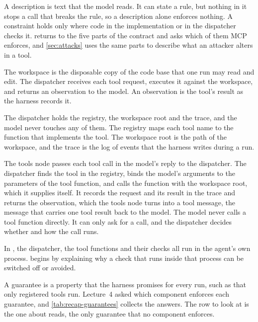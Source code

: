 A description is text that the model reads. It can state a rule, but nothing in it stops a call
that breaks the rule, so a description alone enforces nothing. A constraint holds only where code in
the implementation or in the dispatcher checks it.  returns to the five parts
of the contract and asks which of them MCP enforces, and \cref{sec:attacks} uses the same parts to
describe what an attacker alters in a tool.

The workspace is the disposable copy of the code base that one run may read and edit. The
dispatcher receives each tool request, executes it against the workspace, and returns an
observation to the model. An observation is the tool's result as the harness records it.

The dispatcher holds the registry, the workspace root and the trace, and the model never touches any
of them. The registry maps each tool name to the function that implements the tool. The workspace
root is the path of the workspace, and the trace is the log of events that the harness writes
during a run.

The tools node passes each tool call in the model's reply to the dispatcher. The dispatcher finds
the tool in the registry, binds the model's arguments to the parameters of the tool function, and
calls the function with the workspace root, which it supplies itself. It records the request and its
result in the trace and returns the observation, which the tools node turns into a tool message, the
message that carries one tool result back to the model. The model never calls a tool
function directly. It can only ask for a call, and the dispatcher decides whether and how the call
runs.

In \msa{}, the dispatcher, the tool functions and their checks all run in the agent's own process.
 begins by explaining why a check that runs inside that process can be switched off or
avoided.

A guarantee is a property that the harness promises for every run, such as that only registered
tools run. Lecture~4 asked which component enforces each guarantee, and
\cref{tab:recap-guarantees} collects the answers. The row to look at is the one about reads, the
only guarantee that no component enforces.


